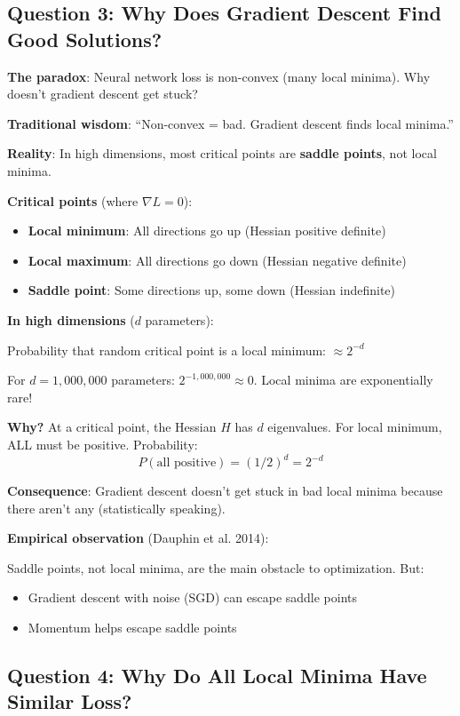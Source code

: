 \subsection{Question 3: Why Does Gradient Descent Find Good Solutions?}

\textbf{The paradox}: Neural network loss is non-convex (many local minima). Why doesn't gradient descent get stuck?

\textbf{Traditional wisdom}: ``Non-convex = bad. Gradient descent finds local minima.''

\textbf{Reality}: In high dimensions, most critical points are \textbf{saddle points}, not local minima.

\textbf{Critical points} (where $\nabla L = 0$):
\begin{itemize}
\item \textbf{Local minimum}: All directions go up (Hessian positive definite)
\item \textbf{Local maximum}: All directions go down (Hessian negative definite)
\item \textbf{Saddle point}: Some directions up, some down (Hessian indefinite)
\end{itemize}

\textbf{In high dimensions} ($d$ parameters):

Probability that random critical point is a local minimum: $\approx 2^{-d}$

For $d = 1{,}000{,}000$ parameters: $2^{-1{,}000{,}000} \approx 0$. Local minima are exponentially rare!

\textbf{Why?} At a critical point, the Hessian $H$ has $d$ eigenvalues. For local minimum, ALL must be positive. Probability:
\[
P(\text{all positive}) = (1/2)^d = 2^{-d}
\]

\textbf{Consequence}: Gradient descent doesn't get stuck in bad local minima because there aren't any (statistically speaking).

\textbf{Empirical observation} (Dauphin et al. 2014):

Saddle points, not local minima, are the main obstacle to optimization. But:
\begin{itemize}
\item Gradient descent with noise (SGD) can escape saddle points
\item Momentum helps escape saddle points
\end{itemize}

\subsection{Question 4: Why Do All Local Minima Have Similar Loss?}

